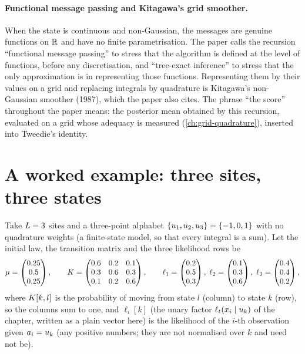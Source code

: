 \paragraph{Functional message passing and Kitagawa's grid smoother.}
When the state is continuous and non-Gaussian, the messages are genuine functions on
$\mathbb{R}$ and have no finite parametrisation. The paper calls the recursion
``functional message passing'' to stress that the algorithm is defined at the level of
functions, before any discretisation, and ``tree-exact inference'' to stress that the
only approximation is in representing those functions. Representing them by their
values on a grid and replacing integrals by quadrature is Kitagawa's non-Gaussian
smoother (1987), which the paper also cites. The phrase ``the score'' throughout the
paper means: the posterior mean obtained by this recursion, evaluated on a grid whose
adequacy is measured (\cref{ch:grid-quadrature}), inserted into Tweedie's identity.

\section{A worked example: three sites, three states}
\label{sec:bp-example}

Take $L=3$ sites and a three-point alphabet $\{u_{1},u_{2},u_{3}\}=\{-1,0,1\}$
with no quadrature weights (a finite-state model, so that every integral is a sum).
Let the initial law, the transition matrix and the three likelihood rows be
\[
  \mu=\begin{pmatrix}0.25\\0.5\\0.25\end{pmatrix},\qquad
  K=\begin{pmatrix}0.6&0.2&0.1\\0.3&0.6&0.3\\0.1&0.2&0.6\end{pmatrix},\qquad
  \ell_1=\begin{pmatrix}0.2\\0.5\\0.3\end{pmatrix},\;
  \ell_2=\begin{pmatrix}0.1\\0.3\\0.6\end{pmatrix},\;
  \ell_3=\begin{pmatrix}0.4\\0.4\\0.2\end{pmatrix},
\]
where $K[k,l]$ is the probability of moving from state $l$ (column) to state $k$
(row), so the columns sum to one, and $\ell_i[k]$ (the unary factor $\ell_t(x_i\mid u_{k})$ of the chapter, written as a plain vector here) is the likelihood of the $i$-th
observation given $a_i=u_{k}$ (any positive numbers; they are not normalised over
$k$ and need not be).

